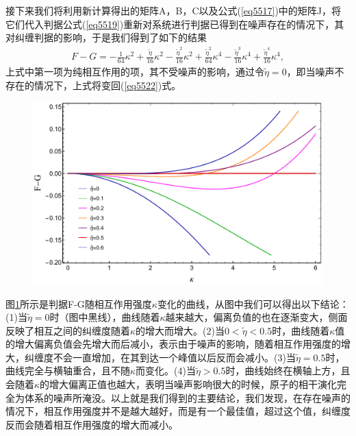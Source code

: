接下来我们将利用新计算得出的矩阵A，B，C以及公式(\ref{eq5517})中的矩阵J，将它们代入判据公式(\ref{eq5519})重新对系统进行判据已得到在噪声存在的情况下，其对纠缠判据的影响，于是我们得到了如下的结果
\begin{align}\label{eq5527}
	F - G =  - \frac{1}{{64}}{\kappa ^2} + \frac{{\tilde \eta }}{{16}}{\kappa ^2} - \frac{{{{\tilde \eta }^2}}}{{16}}{\kappa ^2} + \frac{{{{\tilde \eta }^2}}}{{64}}{\kappa ^4} - \frac{{{{\tilde \eta }^3}}}{{16}}{\kappa ^4} + \frac{{{{\tilde \eta }^4}}}{{16}}{\kappa ^4},
\end{align}
上式中第一项为纯相互作用的项，其不受噪声的影响，通过令$\tilde \eta  = 0$，即当噪声不存在的情况下，上式将变回(\ref{eq5522})式。
\begin{figure}[htbp]
	\centering
	\includegraphics[scale=0.4]{Img/Fig_552.pdf}
	\label{figure552}
\end{figure}


图\ref{figure552}所示是判据F-G随相互作用强度$\kappa$变化的曲线，从图中我们可以得出以下结论：(1)当$\tilde \eta  = 0$时（图中黑线），曲线随着$\kappa$越来越大，偏离负值的也在逐渐变大，侧面反映了相互之间的纠缠度随着$\kappa$的增大而增大。(2)当$0 < \tilde \eta  < 0.5$时，曲线随着$\kappa$值的增大偏离负值会先增大而后减小，表示由于噪声的影响，随着相互作用强度的增大，纠缠度不会一直增加，在其到达一个峰值以后反而会减小。(3)当$\tilde \eta  = 0.5$时，曲线完全与横轴重合，且不随$\kappa$而变化。(4)当$\tilde \eta  > 0.5$时，曲线始终在横轴上方，且会随着$\kappa$的增大偏离正值也越大，表明当噪声影响很大的时候，原子的相干演化完全为体系的噪声所淹没。以上就是我们得到的主要结论，我们发现，在存在噪声的情况下，相互作用强度并不是越大越好，而是有一个最佳值，超过这个值，纠缠度反而会随着相互作用强度的增大而减小。


